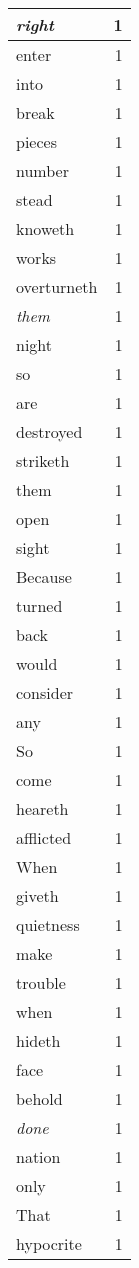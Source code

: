 \begin{center}
\begin{longtable}{l|r}
\emph{right} & 1 \\ \hline
enter & 1 \\ \hline
into & 1 \\ \hline
break & 1 \\ \hline
pieces & 1 \\ \hline
number & 1 \\ \hline
stead & 1 \\ \hline
knoweth & 1 \\ \hline
works & 1 \\ \hline
overturneth & 1 \\ \hline
\emph{them} & 1 \\ \hline
night & 1 \\ \hline
so & 1 \\ \hline
are & 1 \\ \hline
destroyed & 1 \\ \hline
striketh & 1 \\ \hline
them & 1 \\ \hline
open & 1 \\ \hline
sight & 1 \\ \hline
Because & 1 \\ \hline
turned & 1 \\ \hline
back & 1 \\ \hline
would & 1 \\ \hline
consider & 1 \\ \hline
any & 1 \\ \hline
So & 1 \\ \hline
come & 1 \\ \hline
heareth & 1 \\ \hline
afflicted & 1 \\ \hline
When & 1 \\ \hline
giveth & 1 \\ \hline
quietness & 1 \\ \hline
make & 1 \\ \hline
trouble & 1 \\ \hline
when & 1 \\ \hline
hideth & 1 \\ \hline
face & 1 \\ \hline
behold & 1 \\ \hline
\emph{done} & 1 \\ \hline
nation & 1 \\ \hline
only & 1 \\ \hline
That & 1 \\ \hline
hypocrite & 1 \\ \hline

\end{longtable}
\end{center}
